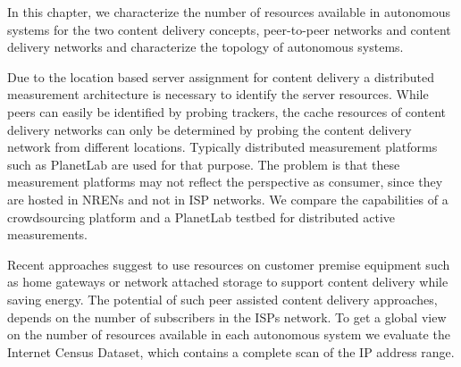 In this chapter, we characterize the number of resources available in autonomous systems for the two content delivery concepts, peer-to-peer networks and content delivery networks and characterize the topology of autonomous systems.

Due to the location based server assignment for content delivery a distributed measurement architecture is necessary to identify the server resources.
While peers can easily be identified by probing trackers, the cache resources of content delivery networks can only be determined by probing the content delivery network from different locations.
Typically distributed measurement platforms such as PlanetLab are used for that purpose.
The problem is that these measurement platforms may not reflect the perspective as consumer, since they are hosted in NRENs and not in ISP networks.
We compare the capabilities of a crowdsourcing platform and a PlanetLab testbed for distributed active measurements.

Recent approaches \cite{greening} suggest to use resources on customer premise equipment such as home gateways or network attached storage to support content delivery while saving energy.
The potential of such peer assisted content delivery approaches, depends on the number of subscribers in the ISPs network.
To get a global view on the number of resources available in each autonomous system we evaluate the Internet Census Dataset, which contains a complete scan of the IP address range.

